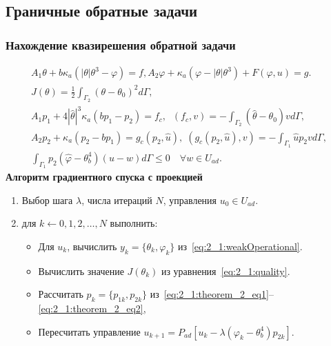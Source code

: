 \subsection{Граничные обратные задачи}
\begin{frame}
    \frametitle{Нахождение квазирешения обратной задачи}
    \begin{gather}
        A_1 \theta + b \kappa_a (| \theta | \theta^3 - \varphi ) =
        f, A_2 \varphi + \kappa_a (\varphi - |\theta|\theta^3) + F(\varphi, u) = g.
        \label{eq:2_1:weakOperational}\\
        J(\theta) = \frac{1}{2} \int_{\Gamma_2} (\theta - \theta_0)^2 d\Gamma,
        \label{eq:2_1:quality}\\
        A_1 p_1 + 4 |\hat{\theta}|^3 \kappa_a(b p_1 - p_2) = f_c,
        \;\; (f_c,v) = - \int_{\Gamma_2} (\hat{\theta} - \theta_0) v d\Gamma,
        \label{eq:2_1:theorem_2_eq1}\\
        A_2 p_2 + \kappa_a (p_2-b p_1) = g_c(p_2, \hat{u}),
        \;(g_c(p_2, \hat{u}), v) = -\int_{\Gamma_1} \hat{u} p_2 v d\Gamma,
        \label{eq:2_1:theorem_2_eq2}\\
        \int_{\Gamma_1} p_2 (\hat{\varphi} - \theta_b^4)(u-w) d\Gamma
        \leq 0 \quad \forall w \in U_{ad}. \label{eq:2_1:theorem_2_eq3}
    \end{gather}
    \textbf{Алгоритм градиентного спуска с проекцией}
    \begin{enumerate}
        \item Выбор шага $\lambda$, числа итераций $N$, управления $u_0 \in U_{ad}$.
        \item для $k \leftarrow 0,1,2, \ldots, N$ выполнить:
        \begin{itemize}
            \item Для $u_{k}$, вычислить $y_k = \{\theta_k, \varphi_k\}$ из~\eqref{eq:2_1:weakOperational}.
            \item Вычислить значение $J(\theta_k)$ из уравнения~\eqref{eq:2_1:quality}.
            \item Рассчитать $p_k=\{p_{1k},p_{2k}\}$
            из~\eqref{eq:2_1:theorem_2_eq1}--\eqref{eq:2_1:theorem_2_eq2},
            \item Пересчитать управление
            $u_{k+1} = P_{ad}\left[ u_k - \lambda (\varphi_k - \theta_b^4)p_{2k} \right]$.
        \end{itemize}
    \end{enumerate}
\end{frame}
